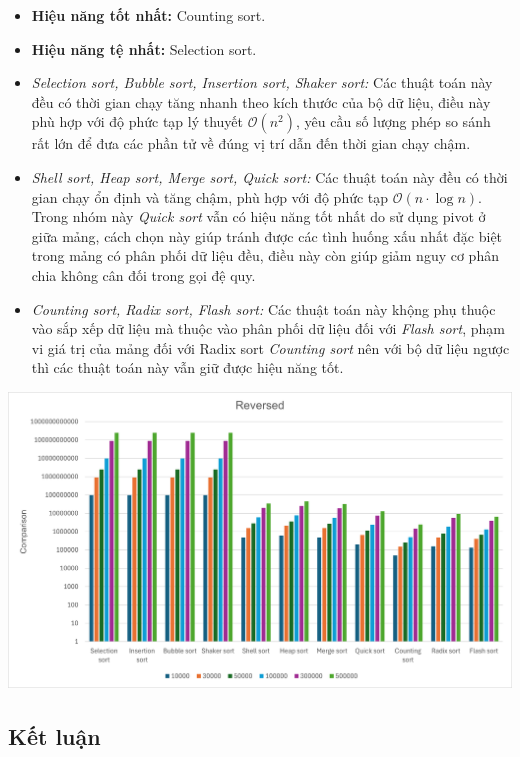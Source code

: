     \begin{itemize}
        \item \textbf{Hiệu năng tốt nhất:} Counting sort.
        \item \textbf{Hiệu năng tệ nhất:} Selection sort.
        \item \textit{Selection sort, Bubble sort, Insertion sort, Shaker sort:} Các thuật toán này đều có thời gian chạy tăng nhanh theo kích thước của bộ dữ liệu, điều này phù hợp với độ phức tạp lý thuyết $\mathcal{O}(n^2)$, yêu cầu số lượng phép so sánh rất lớn để đưa các phần tử về đúng vị trí dẫn đến thời gian chạy chậm.
        \item \textit{Shell sort, Heap sort, Merge sort, Quick sort:} Các thuật toán này đều có thời gian chạy ổn định và tăng chậm, phù hợp với độ phức tạp $\mathcal{O}(n \cdot \log n)$. Trong nhóm này \textit{Quick sort} vẫn có hiệu năng tốt nhất do sử dụng pivot ở giữa mảng, cách chọn này giúp tránh được các tình huống xấu nhất đặc biệt trong mảng có phân phối dữ liệu đều, điều này còn giúp giảm nguy cơ phân chia không cân đối trong gọi đệ quy.
        \item \textit{Counting sort, Radix sort, Flash sort:} Các thuật toán này khộng phụ thuộc vào sắp xếp dữ liệu mà thuộc vào phân phối dữ liệu đối với \textit{Flash sort}, phạm vi giá trị của mảng đối với Radix sort \textit{Counting sort} nên với bộ dữ liệu ngược thì các thuật toán này vẫn giữ được hiệu năng tốt.
    \end{itemize}

    \includegraphics[width = 1\linewidth]{img/experiment/comparison/reversed.png}

\newpage
\subsection{Kết luận}

\newpage